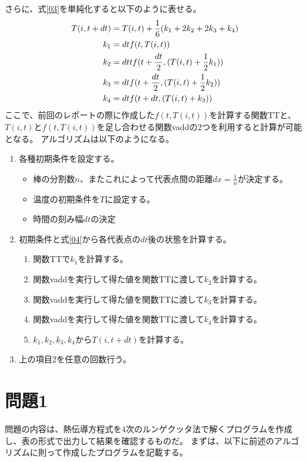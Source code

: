 \documentclass{jsarticle}
\begin{document}
さらに、式\ref{03}を単純化すると以下のように表せる。
\begin{align}
	T(i,t+dt) &= T(i,t) + \frac{1}{6}(k_1 + 2k_2 + 2k_3 + k_4) \label{04} \\
	k_1		  &= dtf(t, T(i,t)) \notag \\
	k_2		  &= dttf(t+\frac{dt}{2}, (T(i,t) + \frac{1}{2}k_1)) \notag \\
	k_3		  &= dtf(t+\frac{dt}{2}, (T(i,t) + \frac{1}{2}k_2)) \notag \\
	k_4		  &= dtf(t+dt, (T(i,t) + k_3))	\notag
\end{align}
ここで、前回のレポートの際に作成した$f(t, T(i,t))$を計算する関数TTと、
$T(i,t)$と$f(t, T(i,t))$を足し合わせる関数vaddの2つを利用すると計算が可能となる。
アルゴリズムは以下のようになる。
\begin{enumerate}
	\item 各種初期条件を設定する。
	\begin{itemize}
		\item 棒の分割数$n$、またこれによって代表点間の距離$dx=\frac{1}{n}$が決定する。
		\item 温度の初期条件を$T$に設定する。
		\item 時間の刻み幅$dt$の決定
	\end{itemize}
	\item 初期条件と式\ref{04}から各代表点の$dt$後の状態を計算する。
	\begin{enumerate}
		\item 関数TTで$k_1$を計算する。
		\item 関数vaddを実行して得た値を関数TTに渡して$k_2$を計算する。
		\item 関数vaddを実行して得た値を関数TTに渡して$k_3$を計算する。
		\item 関数vaddを実行して得た値を関数TTに渡して$k_4$を計算する。
		\item $k_1, k_2, k_3, k_4$から$T(i, t+dt)$を計算する。
	\end{enumerate}
	\item 上の項目2を任意の回数行う。
\end{enumerate}

\section{問題1}
問題の内容は、熱伝導方程式を4次のルンゲクッタ法で解くプログラムを作成し、表の形式で出力して結果を確認するものだ。
まずは、以下に前述のアルゴリズムに則って作成したプログラムを記載する。
\end{document}

